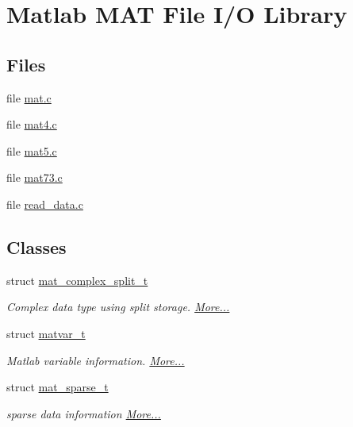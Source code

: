 \hypertarget{group___m_a_t}{}\section{Matlab M\+AT File I/O Library}
\label{group___m_a_t}
\subsection*{Files}
\begin{DoxyCompactItemize}
\item 
file \hyperlink{mat_8c}{mat.\+c}
\item 
file \hyperlink{mat4_8c}{mat4.\+c}
\item 
file \hyperlink{mat5_8c}{mat5.\+c}
\item 
file \hyperlink{mat73_8c}{mat73.\+c}
\item 
file \hyperlink{read__data_8c}{read\+\_\+data.\+c}
\end{DoxyCompactItemize}
\subsection*{Classes}
\begin{DoxyCompactItemize}
\item 
struct \hyperlink{group___m_a_t_structmat__complex__split__t}{mat\+\_\+complex\+\_\+split\+\_\+t}
\begin{DoxyCompactList}\small\item\em Complex data type using split storage.  \hyperlink{group___m_a_t_structmat__complex__split__t}{More...}\end{DoxyCompactList}\item 
struct \hyperlink{group___m_a_t_structmatvar__t}{matvar\+\_\+t}
\begin{DoxyCompactList}\small\item\em Matlab variable information.  \hyperlink{group___m_a_t_structmatvar__t}{More...}\end{DoxyCompactList}\item 
struct \hyperlink{group___m_a_t_structmat__sparse__t}{mat\+\_\+sparse\+\_\+t}
\begin{DoxyCompactList}\small\item\em sparse data information  \hyperlink{group___m_a_t_structmat__sparse__t}{More...}\end{DoxyCompactList}\end{DoxyCompactItemize}
